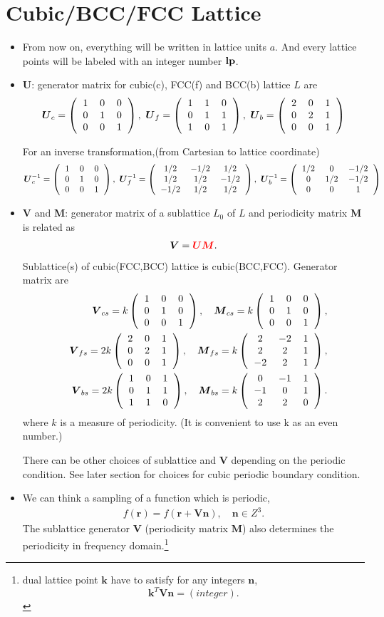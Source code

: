 \documentclass[10pt]{book}
\def\bm{\boldsymbol}
\newcommand{\bea}{\begin{eqnarray}}
\newcommand{\eea}{\end{eqnarray}}
\newcommand{\no}{\nonumber \\}
\newcommand{\threedmat}[9]
{\left(\begin{tabular}{ccc} {$#1$}&{$#2$}&{$#3$} \\
		{$#4$}&{$#5$}&{$#6$}\\
		{$#7$}&{$#8$}&{$#9$}\\
	    \end{tabular}\right)}
\begin{document}
\section{Cubic/BCC/FCC Lattice } 
\begin{itemize}
	\item From now on, everything will be written in lattice units $a$. And every lattice points will be labeled
	      with an integer number ${\bf lp}$.
	
	\item {\bf U}: generator matrix for cubic(c), FCC(f) and BCC(b) lattice $L$ are 
	  \bea 
	  {\bm U}_c=\threedmat{1}{0}{0}{0}{1}{0}{0}{0}{1},\
	  {\bm U}_f=\threedmat{1}{1}{0}{0}{1}{1}{1}{0}{1},\
	  {\bm U}_b=\threedmat{2}{0}{1}{0}{2}{1}{0}{0}{1}
	  \eea 
	  
	  For an inverse transformation,(from Cartesian to lattice coordinate) 
	  \bea 
	  {\bm U}_c^{-1}=\threedmat{1}{0}{0}{0}{1}{0}{0}{0}{1},\
	  {\bm U}_f^{-1}=\threedmat{1/2}{-1/2}{1/2}{1/2}{1/2}{-1/2}{-1/2}{1/2}{1/2},\
	  {\bm U}_b^{-1}=\threedmat{1/2}{0}{-1/2}{0}{1/2}{-1/2}{0}{0}{1}
	  \eea 
	  
    \item {\bf V} and {\bf M}: generator matrix of a sublattice $L_0$ of $L$ 
              and  periodicity matrix ${\bm M}$ is related as 
      \bea 
      {\bm V}={\color{red}{\bm U}{\bm M}}.
      \eea 
      Sublattice(s) of cubic(FCC,BCC) lattice is cubic(BCC,FCC).       
      Generator matrix are
      \bea 
      & &{\bm V}_{cs}=k\threedmat{1}{0}{0}{0}{1}{0}{0}{0}{1},\quad 
         {\bm M}_{cs}=k\threedmat{1}{0}{0}{0}{1}{0}{0}{0}{1},\no 
      & &{\bm V}_{fs}=2k\threedmat{2}{0}{1}{0}{2}{1}{0}{0}{1},\quad 
         {\bm M}_{fs}=k\threedmat{2}{-2}{1}{2}{2}{1}{-2}{2}{1},\no 
      & &{\bm V}_{bs}=2k\threedmat{1}{0}{1}{0}{1}{1}{1}{1}{0},\quad 
         {\bm M}_{bs}=k\threedmat{0}{-1}{1}{-1}{0}{1}{2}{2}{0}.
      \eea
      where $k$ is a measure of periodicity. (It is convenient to use k as an even number.)
      
      There can be other choices of sublattice and ${\bm V}$ depending on the periodic condition.
      See later section for choices for cubic periodic boundary condition. 
            
  \item  We can think a sampling of a function which is periodic,  
      \bea 
      f({\bm r})=f({\bm r}+{\bm V}{\bm n}),\quad  {\bm n}\in Z^3.
      \eea 
      The sublattice generator ${\bm V}$ (periodicity matrix ${\bm M}$) also determines the periodicity 
      in frequency domain.\footnote{  dual lattice point ${\bm k}$ have to satisfy for any integers ${\bm n}$,
      $${\bm k}^T{\bm V}{\bm n}=(integer).$$  
     }
      



\end{itemize}
\end{document}
